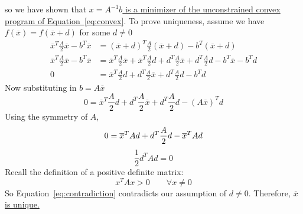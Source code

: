 \documentclass[11pt]{article} %
\begin{document}
so we have shown that \uline{$x = A^{-1} b$ is a minimizer of the unconstrained convex program of Equation~\ref{eq:convex}}.
To prove uniqueness, assume we have $f(\overline{x})= f(\overline{x} +d )$ for some $d \ne 0$
\begin{equation}
\begin{split}
\overline{x}^T \frac{A}{2} \overline{x} - b^T \overline{x} &= (\overline{x}+d)^T \frac{A}{2}(\overline{x}+d) - b^T( \overline{x}+d)  \\
\overline{x}^T \frac{A}{2} \overline{x} - b^T \overline{x} &=\overline{x}^T \frac{A}{2} \overline{x} +\overline{x}^T \frac{A}{2} d + d^T \frac{A}{2} \overline{x} + d^T \frac{A}{2} d - b^T \overline{x} -b^T d \\
0 &=\overline{x}^T \frac{A}{2} d + d^T \frac{A}{2} \overline{x} + d^T \frac{A}{2} d -b^T d 
\end{split}
\end{equation}
Now substituting in $b=A \overline{x} $
\begin{equation}
0 =\overline{x}^T \frac{A}{2} d + d^T \frac{A}{2} \overline{x} + d^T \frac{A}{2} d -(A\overline{x})^T d 
\end{equation}
Using the symmetry of $A$,
\begin{equation}
0=\overline{x}^T A d  + d^T \frac{A}{2} d -\overline{x}^T A d \\
\end{equation}
\begin{equation}
 \frac{1}{2} d^T A d=0
\label{eq:contradiction}
\end{equation}
Recall the definition of a positive definite matrix:
\begin{equation}
x^T A x > 0 \quad \quad \forall x \ne 0
\end{equation}
So Equation~\ref{eq:contradiction} contradicts our assumption of $d \ne 0$. Therefore, \uline{$\overline{x}$ is unique.}
\end{document}

